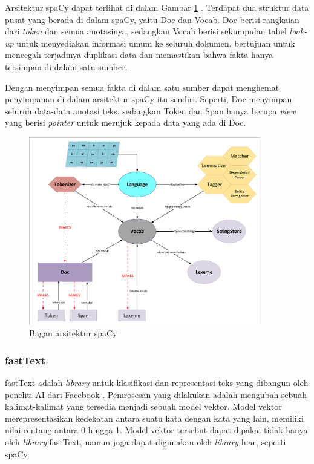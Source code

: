 Arsitektur spaCy dapat terlihat di dalam Gambar \ref{fig:spaCy_arch} \parencite{spacy2}. Terdapat dua struktur data pusat yang berada di dalam spaCy, yaitu Doc dan Vocab. Doc berisi rangkaian dari \textit{token} dan semua anotasinya, sedangkan Vocab berisi sekumpulan tabel \textit{look-up} untuk menyediakan informasi umum ke seluruh dokumen, bertujuan untuk mencegah terjadinya duplikasi data dan memastikan bahwa fakta hanya tersimpan di dalam satu sumber.

Dengan menyimpan semua fakta di dalam satu sumber dapat menghemat penyimpanan di dalam arsitektur spaCy itu sendiri. Seperti, Doc menyimpan seluruh data-data anotasi teks, sedangkan Token dan Span hanya berupa \textit{view} yang berisi \textit{pointer} untuk merujuk kepada data yang ada di Doc.

\begin{figure}[H]
	\centering
	\includegraphics[width=0.9\textwidth, trim=2 2 2 2, clip]{resources/2/spacy_arch.pdf}
	\caption{Bagan arsitektur spaCy \parencite{spacy2}}
	\label{fig:spaCy_arch}
\end{figure}

\subsubsection{fastText}

fastText adalah \textit{library} untuk klasifikasi dan representasi teks yang dibangun oleh peneliti AI dari Facebook \parencite{joulin2017bag}. Pemrosesan yang dilakukan adalah mengubah sebuah kalimat-kalimat yang tersedia menjadi sebuah model vektor. Model vektor merepresentasikan kedekatan antara suatu kata dengan kata yang lain, memiliki nilai rentang antara 0 hingga 1. Model vektor tersebut dapat dipakai tidak hanya oleh \textit{library} fastText, namun juga dapat digunakan oleh \textit{library} luar, seperti spaCy.

